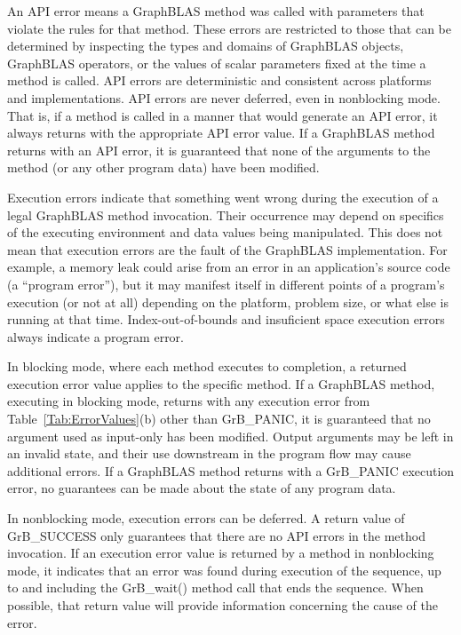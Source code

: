 An API error means a GraphBLAS method was called with parameters that
violate the rules for that method.  These errors are restricted to those
that can be determined by inspecting the types and domains of GraphBLAS
objects, GraphBLAS operators, or the values of scalar parameters fixed at
the time a method is called.  API errors are deterministic and consistent
across platforms and implementations.  API errors are never deferred,
even in nonblocking mode. That is, if a method is called in a manner
that would generate an API error, it always returns with the appropriate
API error value.  If a GraphBLAS method returns with an API error, it
is guaranteed that none of the arguments to the method (or any other
program data) have been modified.

Execution errors indicate that something went wrong during the execution
of a legal GraphBLAS method invocation.  Their occurrence may depend on
specifics of the executing environment and data values being manipulated.
This does not mean that execution errors are the fault of the GraphBLAS
implementation.  For example, a memory leak could arise from an error in
an application's source code (a ``program error''), but it may manifest
itself in different points of a program's execution (or not at all)
depending on the platform, problem size, or what else is running at
that time.  Index-out-of-bounds and insuficient space execution errors
always indicate a program error.

In blocking mode, where each method executes to completion, a returned
execution error value applies to the specific method.  If a GraphBLAS
method, executing in blocking mode, returns with any execution error
from Table~\ref{Tab:ErrorValues}(b) other than {\sf GrB\_PANIC}, it
is guaranteed that no argument used as input-only has been modified.
Output arguments may be left in an invalid state, and their use downstream
in the program flow may cause additional errors.  If a GraphBLAS method
returns with a {\sf GrB\_PANIC} execution error, no guarantees can be
made about the state of any program data.

In nonblocking mode, execution errors can be deferred.  A return value
of {\sf GrB\_SUCCESS} only guarantees that there are no API errors in
the method invocation.  If an execution error value is returned by a
method in nonblocking mode, it indicates that an error was found during
execution of the sequence, up to and including the {\sf GrB\_wait()}
method call that ends the sequence. When possible, that return value
will provide information concerning the cause of the error.

